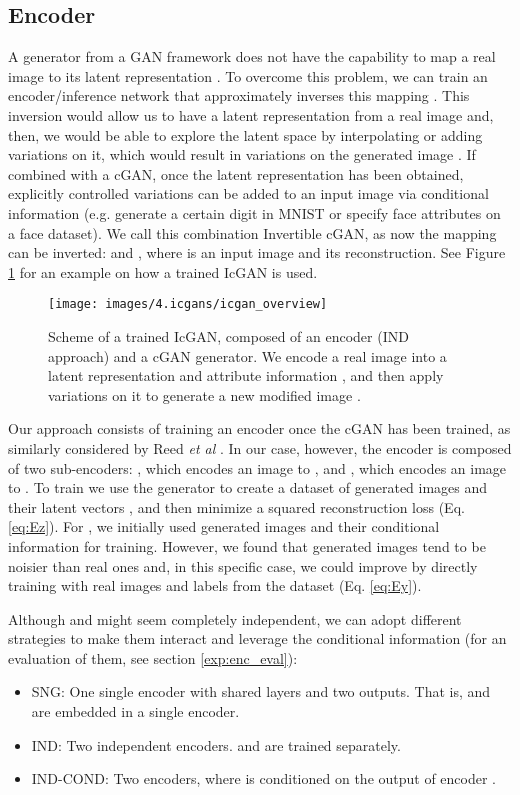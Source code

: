 \documentclass{article}
\begin{document}
\subsection{Encoder} \label{icgan:enc}
A generator  from a GAN framework does not have the capability to map a real image  to its latent representation . To overcome this problem, we can train an encoder/inference network  that approximately inverses this mapping . This inversion would allow us to have a latent representation  from a real image  and, then, we would be able to explore the latent space by interpolating or adding variations on it, which would result in variations on the generated image . If combined with a cGAN, once the latent representation  has been obtained, explicitly controlled variations can be added to an input image via conditional information  (e.g. generate a certain digit in MNIST or specify face attributes on a face dataset). We call this combination Invertible cGAN, as now the mapping can be inverted:  and , where  is an input image and  its reconstruction. See Figure \ref{fig:icgan_overview} for an example on how a trained IcGAN is used.

\begin{figure}[t]
        \centering
        \texttt{[image: images/4.icgans/icgan\_overview]}
        \caption{Scheme of a trained IcGAN, composed of an encoder (IND approach) and a cGAN generator. We encode a real image  into a latent representation  and attribute information , and then apply variations on it to generate a new modified image .}
        \label{fig:icgan_overview}
\end{figure}

Our approach consists of training an encoder  once the cGAN has been trained, as similarly considered by Reed \textit{et al} \cite{Reed2016}. In our case, however, the encoder  is composed of two sub-encoders: , which encodes an image to , and , which encodes an image to . To train  we use the generator to create a dataset of generated images  and their latent vectors , and then minimize a squared reconstruction loss  (Eq. \ref{eq:Ez}). For , we initially used generated images  and their conditional information  for training. However, we found that generated images tend to be noisier than real ones and, in this specific case, we could improve  by directly training with real images and labels from the dataset  (Eq. \ref{eq:Ey}).
 

Although  and  might seem completely independent, we can adopt different strategies to make them interact and leverage the conditional information (for an evaluation of them, see section \ref{exp:enc_eval}): 
\begin{itemize}
\item SNG: One single encoder with shared layers and two outputs. That is,  and  are embedded in a single encoder.
\item IND: Two independent encoders.  and  are trained separately.
\item IND-COND: Two encoders, where  is conditioned on the output of encoder .
\end{itemize}
\end{document}
